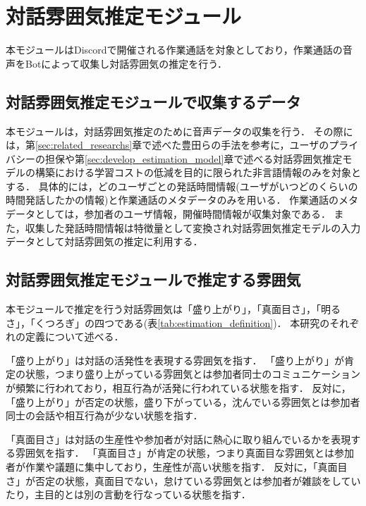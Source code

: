 \section{対話雰囲気推定モジュール\label{node:estimation_module}}

本モジュールはDiscordで開催される作業通話を対象としており，作業通話の音声をBotによって収集し対話雰囲気の推定を行う．

\subsection{対話雰囲気推定モジュールで収集するデータ\label{item:estimation_module_collection_data}}

本モジュールは，対話雰囲気推定のために音声データの収集を行う．
その際には，第\ref{sec:related_researchs}章で述べた豊田らの手法を参考に，ユーザのプライバシーの担保や第\ref{sec:develop_estimation_model}章で述べる対話雰囲気推定モデルの構築における学習コストの低減を目的に限られた非言語情報のみを対象とする．
具体的には，どのユーザごとの発話時間情報(ユーザがいつどのくらいの時間発話したかの情報)と作業通話のメタデータのみを用いる．
作業通話のメタデータとしては，参加者のユーザ情報，開催時間情報が収集対象である．
また，収集した発話時間情報は特徴量として変換され対話雰囲気推定モデルの入力データとして対話雰囲気の推定に利用する．

\subsection{対話雰囲気推定モジュールで推定する雰囲気\label{item:estimated_atmosphere}}

本モジュールで推定を行う対話雰囲気は「盛り上がり」，「真面目さ」，「明るさ」，「くつろぎ」の四つである(表\ref{tab:estimation_definition})．
本研究のそれぞれの定義について述べる．

「盛り上がり」は対話の活発性を表現する雰囲気を指す．
「盛り上がり」が肯定の状態，つまり盛り上がっている雰囲気とは参加者同士のコミュニケーションが頻繁に行われており，相互行為が活発に行われている状態を指す．
反対に，「盛り上がり」が否定の状態，盛り下がっている，沈んでいる雰囲気とは参加者同士の会話や相互行為が少ない状態を指す．

「真面目さ」は対話の生産性や参加者が対話に熱心に取り組んでいるかを表現する雰囲気を指す．
「真面目さ」が肯定の状態，つまり真面目な雰囲気とは参加者が作業や議題に集中しており，生産性が高い状態を指す．
反対に，「真面目さ」が否定の状態，真面目でない，怠けている雰囲気とは参加者が雑談をしていたり，主目的とは別の言動を行なっている状態を指す．

